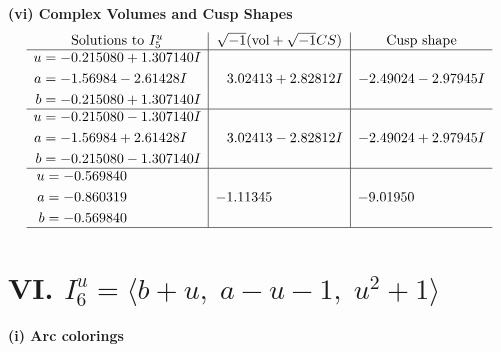 \documentclass[1p]{elsarticle_modified}
\theoremstyle{definition}
\newcommand{\I}{\sqrt{-1}}
\begin{document}
\newpage\flushleft \textbf{(vi) Complex Volumes and Cusp Shapes}
$$\begin{array}{c|c|c}  
\text{Solutions to }I^u_{5}& \I (\text{vol} + \sqrt{-1}CS) & \text{Cusp shape}\\
 \hline 
\begin{aligned}
u &= -0.215080 + 1.307140 I \\
a &= -1.56984 - 2.61428 I \\
b &= -0.215080 + 1.307140 I\end{aligned}
 & \phantom{-}3.02413 + 2.82812 I & -2.49024 - 2.97945 I \\ \hline\begin{aligned}
u &= -0.215080 - 1.307140 I \\
a &= -1.56984 + 2.61428 I \\
b &= -0.215080 - 1.307140 I\end{aligned}
 & \phantom{-}3.02413 - 2.82812 I & -2.49024 + 2.97945 I \\ \hline\begin{aligned}
u &= -0.569840\phantom{ +0.000000I} \\
a &= -0.860319\phantom{ +0.000000I} \\
b &= -0.569840\phantom{ +0.000000I}\end{aligned}
 & -1.11345\phantom{ +0.000000I} & -9.01950\phantom{ +0.000000I}\\
 \hline 
 \end{array}$$\newpage\newpage\renewcommand{\arraystretch}{1}
\centering \section*{VI. $I^u_{6}= \langle b+u,\;a- u-1,\;u^2+1 \rangle$}
\flushleft \textbf{(i) Arc colorings}\\
\end{document}
